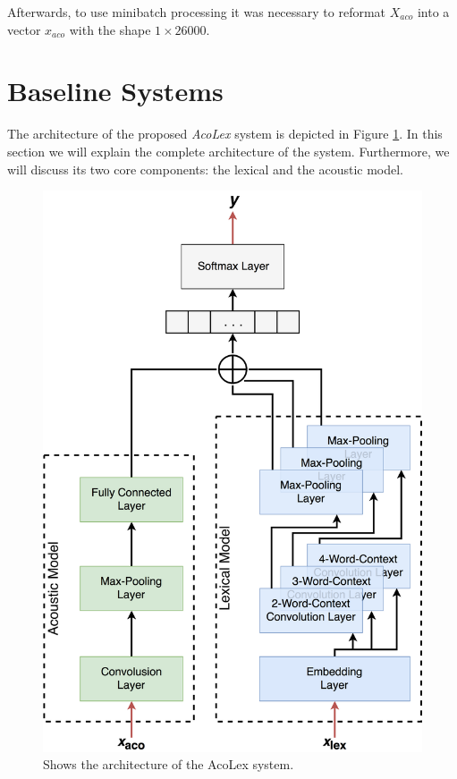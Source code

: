 \documentclass[11pt,a4paper]{article}
\begin{document}
	\noindent Afterwards, to use minibatch processing it was necessary to reformat $X_{aco}$ into a vector $x_{aco}$ with the shape $1 \times 26000$.
	
	
\section{Baseline Systems}
The architecture of the proposed \textit{AcoLex} system is depicted in Figure \ref{pic:sysArchitecture}. In this section we will explain the complete architecture of the system. Furthermore, we will discuss its two core components: the lexical and the acoustic model.

\begin{figure}[h]
	\centering
	\includegraphics[width=1\linewidth]{Bilder/acolex_CNN_paper.png}
	\caption{Shows the architecture of the AcoLex system.}
	\label{pic:sysArchitecture}
\end{figure}
\end{document}
